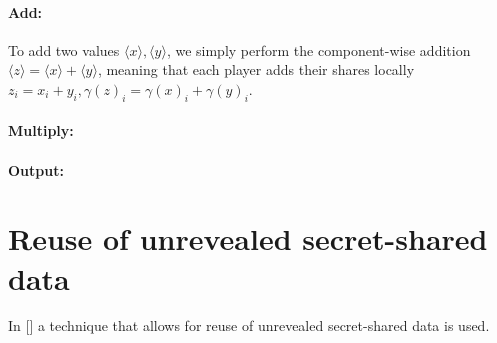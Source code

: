 \documentclass{article}
\begin{document}
\paragraph{Add:} To add two values $\langle x \rangle, \langle y \rangle$, we simply perform the component-wise addition $\langle z \rangle = \langle x \rangle + \langle y \rangle$, meaning that each player adds their shares locally $z_i = x_i + y_i, \gamma(z)_i = \gamma(x)_i + \gamma(y)_i$. %

\paragraph{Multiply:}

\paragraph{Output:}


\section{Reuse of unrevealed secret-shared data}
In [] a technique that allows for reuse of unrevealed secret-shared data is used.
\end{document}
